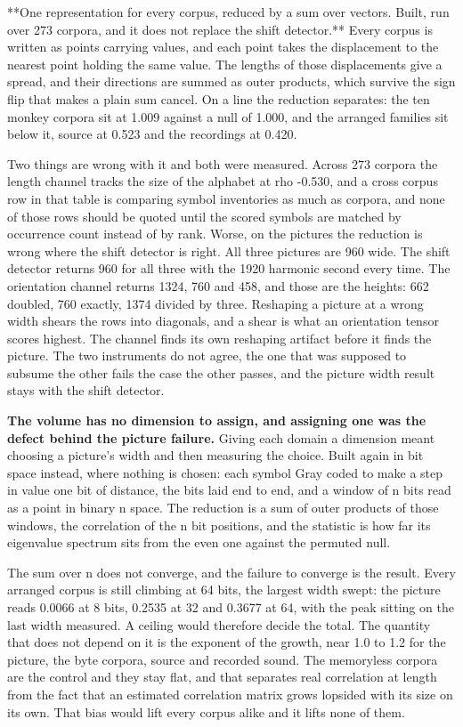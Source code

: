 **One representation for every corpus, reduced by a sum over vectors. Built, run over 273 corpora, and it does not replace the shift detector.** Every corpus is written as points carrying values, and each point takes the displacement to the nearest point holding the same value. The lengths of those displacements give a spread, and their directions are summed as outer products, which survive the sign flip that makes a plain sum cancel. On a line the reduction separates: the ten monkey corpora sit at 1.009 against a null of 1.000, and the arranged families sit below it, source at 0.523 and the recordings at 0.420.

Two things are wrong with it and both were measured. Across 273 corpora the length channel tracks the size of the alphabet at rho -0.530, and a cross corpus row in that table is comparing symbol inventories as much as corpora, and none of those rows should be quoted until the scored symbols are matched by occurrence count instead of by rank. Worse, on the pictures the reduction is wrong where the shift detector is right. All three pictures are 960 wide. The shift detector returns 960 for all three with the 1920 harmonic second every time. The orientation channel returns 1324, 760 and 458, and those are the heights: 662 doubled, 760 exactly, 1374 divided by three. Reshaping a picture at a wrong width shears the rows into diagonals, and a shear is what an orientation tensor scores highest. The channel finds its own reshaping artifact before it finds the picture. The two instruments do not agree, the one that was supposed to subsume the other fails the case the other passes, and the picture width result stays with the shift detector.

\textbf{The volume has no dimension to assign, and assigning one was the defect behind the picture failure.} Giving each domain a dimension meant choosing a picture's width and then measuring the choice. Built again in bit space instead, where nothing is chosen: each symbol Gray coded to make a step in value one bit of distance, the bits laid end to end, and a window of n bits read as a point in binary n space. The reduction is a sum of outer products of those windows, the correlation of the n bit positions, and the statistic is how far its eigenvalue spectrum sits from the even one against the permuted null.

The sum over n does not converge, and the failure to converge is the result. Every arranged corpus is still climbing at 64 bits, the largest width swept: the picture reads 0.0066 at 8 bits, 0.2535 at 32 and 0.3677 at 64, with the peak sitting on the last width measured. A ceiling would therefore decide the total. The quantity that does not depend on it is the exponent of the growth, near 1.0 to 1.2 for the picture, the byte corpora, source and recorded sound. The memoryless corpora are the control and they stay flat, and that separates real correlation at length from the fact that an estimated correlation matrix grows lopsided with its size on its own. That bias would lift every corpus alike and it lifts none of them.

